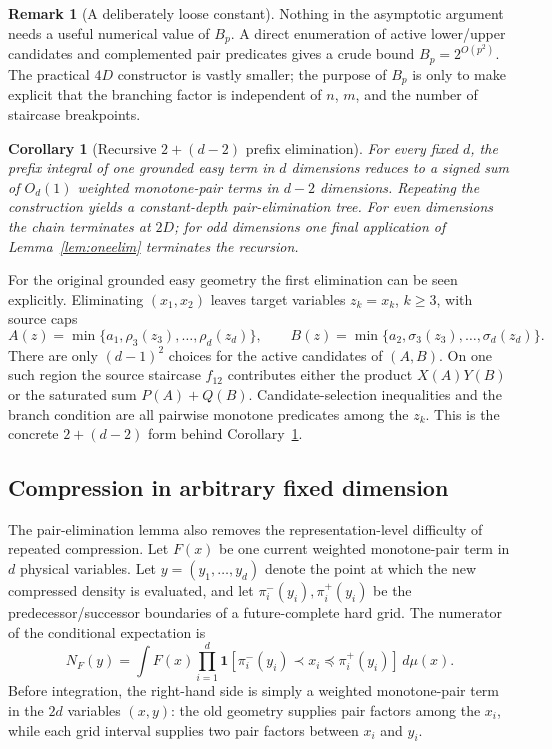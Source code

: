 \documentclass[12pt,a4paper]{article}
\newtheorem{corollary}[theorem]{Corollary}
\theoremstyle{definition}
\newtheorem{remark}[theorem]{Remark}
\newcommand{\1}{\mathbf 1}
\begin{document}
\begin{remark}[A deliberately loose constant]
Nothing in the asymptotic argument needs a useful numerical value of $B_p$.  A direct enumeration of active lower/upper candidates and complemented pair predicates gives a crude bound $B_p=2^{O(p^2)}$.  The practical $4D$ constructor is vastly smaller; the purpose of $B_p$ is only to make explicit that the branching factor is independent of $n$, $m$, and the number of staircase breakpoints.
\end{remark}

\begin{corollary}[Recursive $2+(d-2)$ prefix elimination]         \label{cor:recursivepair}
For every fixed $d$, the prefix integral of one grounded easy term in $d$ dimensions reduces to a signed sum of $O_d(1)$ weighted monotone-pair terms in $d-2$ dimensions.  Repeating the construction yields a constant-depth pair-elimination tree.  For even dimensions the chain terminates at $2D$; for odd dimensions one final application of Lemma~\ref{lem:oneelim} terminates the recursion.
\end{corollary}

For the original grounded easy geometry the first elimination can be seen explicitly.  Eliminating $(x_1,x_2)$ leaves target variables $z_k=x_k$, $k\ge3$, with source caps
\[
A(z)=\min\{a_1,\rho_3(z_3),\ldots,\rho_d(z_d)\},\qquad
B(z)=\min\{a_2,\sigma_3(z_3),\ldots,\sigma_d(z_d)\}.
\]
There are only $(d-1)^2$ choices for the active candidates of $(A,B)$.  On one such region the source staircase $f_{12}$ contributes either the product $X(A)Y(B)$ or the saturated sum $P(A)+Q(B)$.  Candidate-selection inequalities and the branch condition are all pairwise monotone predicates among the $z_k$.  This is the concrete $2+(d-2)$ form behind Corollary~\ref{cor:recursivepair}.

\subsection{Compression in arbitrary fixed dimension}

The pair-elimination lemma also removes the representation-level difficulty of repeated compression.  Let $F(x)$ be one current weighted monotone-pair term in $d$ physical variables.  Let $y=(y_1,\ldots,y_d)$ denote the point at which the new compressed density is evaluated, and let $\pi_i^-(y_i),\pi_i^+(y_i)$ be the predecessor/successor boundaries of a future-complete hard grid.  The numerator of the conditional expectation is
\begin{equation}
N_F(y)=\int F(x)\prod_{i=1}^d
\mathbf1[\pi_i^-(y_i)\prec x_i\preceq\pi_i^+(y_i)]\,d\mu(x).       \label{eq:generalcompression}
\end{equation}
Before integration, the right-hand side is simply a weighted monotone-pair term in the $2d$ variables $(x,y)$: the old geometry supplies pair factors among the $x_i$, while each grid interval supplies two pair factors between $x_i$ and $y_i$.
\end{document}
